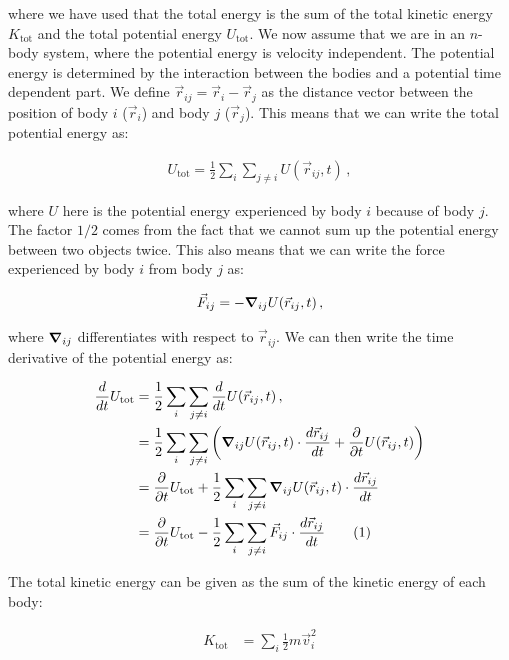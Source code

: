 \documentclass[reprint,english,notitlepage]{revtex4-1}  %
\newcommand\numberthis{\addtocounter{equation}{1}\tag{\theequation}}
\begin{document}
where we have used that the total energy is the sum of the total kinetic energy $K_\text{tot}$ and the total potential energy $U_\text{tot}$. We now assume that we are in an $n$-body system, where the potential energy is velocity independent. The potential energy is determined by the interaction between the bodies and a potential time dependent part. We define $\vec{r}_{ij} = \vec{r}_i - \vec{r}_j$ as the distance vector between the position of body $i$ ($\vec{r}_i$) and body $j$ ($\vec{r}_j$). This means that we can write the total potential energy as:

\begin{align*}
U_\text{tot} = \frac{1}{2}\sum\limits_i \sum\limits_{j\neq i} U(\vec{r}_{ij},t) \, ,
\end{align*}

where $U$ here is the potential energy experienced by body $i$ because of body $j$. The factor $1/2$ comes from the fact that we cannot sum up the potential energy between two objects twice. This also means that we can write the force experienced by body $i$ from body $j$ as:

\begin{align*}
\vec{F}_{ij} = - \gradient_{ij} U(\vec{r}_{ij}, t) \, ,
\end{align*}

where $\gradient_{ij}$ differentiates with respect to $\vec{r}_{ij}$. We can then write the time derivative of the potential energy as:

\begin{align*}
\frac{d}{dt}U_\text{tot} &= \frac{1}{2}\sum\limits_{i} \sum\limits_{j\neq i} \frac{d}{dt} U (\vec{r}_{ij}, t ) \, , \\
&= \frac{1}{2}\sum\limits_{i} \sum\limits_{j\neq i} \bigg( \gradient_{ij} U (\vec{r}_{ij}, t ) \cdot \frac{d\vec{r}_{ij}}{dt} + \frac{\partial }{\partial t} U(\vec{r}_{ij}, t) \bigg) \\
&= \frac{\partial}{\partial t} U_\text{tot} + \frac{1}{2}\sum\limits_{i} \sum\limits_{j\neq i} \gradient_{ij} U (\vec{r}_{ij}, t ) \cdot \frac{d\vec{r}_{ij}}{dt} \\
&= \frac{\partial}{\partial t} U_\text{tot} - \frac{1}{2}\sum\limits_{i} \sum\limits_{j\neq i} \vec{F}_{ij} \cdot \frac{d\vec{r}_{ij}}{dt} \numberthis \label{eq:pot_en_der}
\end{align*}

The total kinetic energy can be given as the sum of the kinetic energy of each body:

\begin{align*}
K_\text{tot} &= \sum\limits_i \frac{1}{2} m \vec{v}_i^2 
\end{align*}
\end{document}
